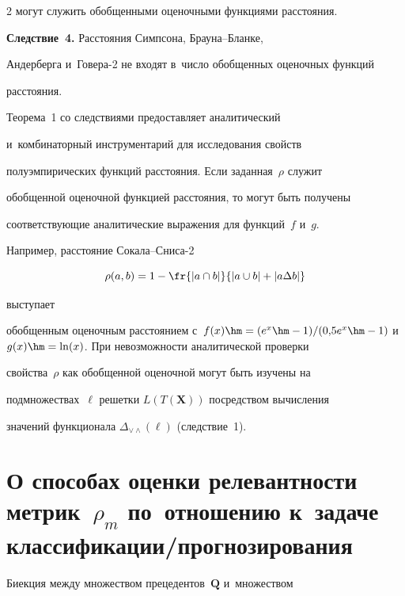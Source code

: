 \begin{multicols}{2}
могут служить обобщенными оценочными функциями расстояния. 



\smallskip



\noindent

\textbf{Следствие~4.} Расстояния Симпсона, Бра\-у\-на--Блан\-ке, 

Андерберга и~Говера-2  не входят в~число обобщенных оценочных функций 

расстояния.



\smallskip



     Теорема~1 со следствиями предоставляет аналитический 

и~комбинаторный инструментарий для исследования свойств 

полуэмпирических функций расстояния. Если заданная~$\rho$ служит 

обобщенной оценочной функцией расстояния, то могут быть получены 

соответствующие аналитические выражения для функций~$f$ и~$g$. 

Например, расстояние Со\-ка\-ла--Сни\-са-2

$$

\rho(a,b) = 1- \fr{\vert a\cap 

b\vert }{\vert a\cup b\vert + \vert a\Delta b\vert}

$$ 

выступает 

обобщенным оценочным расстоянием с~$f(x)\hm= (e^x\hm-1)/(0{,}5e^x\hm-1)$ и~$g(x)\hm=\ln (x)$. При невозможности аналитической проверки 

свойства~$\rho$ как обобщенной оценочной могут быть изучены на 

подмножествах~$\ell$ решетки $L(T(\mathbf{X}))$ посредством вычисления 

значений функционала $\Delta_{\vee\wedge}(\ell)$ (следствие~1). 



\section{О способах оценки релевантности метрик~$\rho_m$ по~отношению к~задаче клас\-сификации/прогнозирования}



     Биекция между множеством прецедентов~$\mathbf{Q}$ и~множеством 


\end{multicols}
